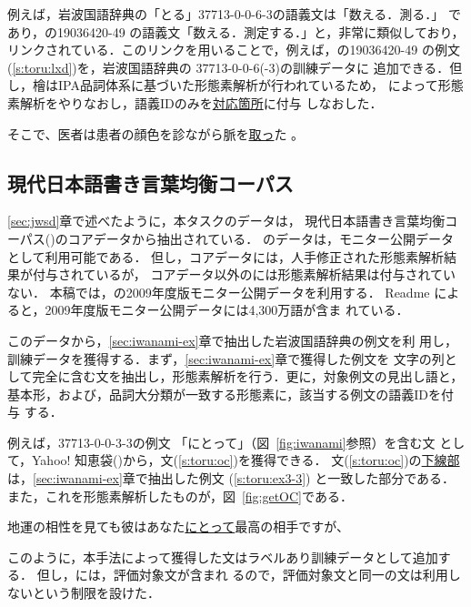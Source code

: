\documentclass[japanese]{jnlp_1.4}
\newcommand{\OC}{}
\newcommand{\unidic}{}
\newcommand{\bccwj}{}
\newcommand{\lxd}{}
\begin{document}
例えば，岩波国語辞典の「とる」37713-0-0-6-3の語義文は「数える．測る．」
であり，\lxd{}の19036420-49 の語義文「数える．測定する．」と，非常に類似しており，
リンクされている．このリンクを用いることで，例えば，\lxd{}の19036420-49
の例文(\ref{s:toru:lxd})を，岩波国語辞典の 37713-0-0-6(-3)の訓練データに
追加できる．但し，檜はIPA品詞体系に基づいた形態素解析が行われているため，
\unidic{}によって形態素解析をやりなおし，語義IDのみを\ul{対応箇所}に付与
しなおした．


\begin{exe}
\ex \label{s:toru:lxd}
そこで、医者は患者の顔色を診ながら脈を\ul{取っ}た 。 
\end{exe}



\subsection{現代日本語書き言葉均衡コーパス} 
\label{sec:bccwj}

\ref{sec:jwsd}章で述べたように，本タスクのデータは，
現代日本語書き言葉均衡コーパス(\bccwj)のコアデータから抽出されている．
\bccwj のデータは，モニター公開データとして利用可能である．
但し，コアデータには，人手修正された形態素解析結果が付与されているが，
コアデータ以外の\bccwj には形態素解析結果は付与されていない．
本稿では，\bccwj の2009年度版モニター公開データを利用する．
Readme によると，\bccwj 2009年度版モニター公開データには4,300万語が含ま
れている．

このデータから，\ref{sec:iwanami-ex}章で抽出した岩波国語辞典の例文を利
用し，訓練データを獲得する．まず，\ref{sec:iwanami-ex}章で獲得した例文を
文字の列として完全に含む文を抽出し，形態素解析を行う．更に，対象例文の見出し語と，
基本形，および，品詞大分類が一致する形態素に，該当する例文の語義IDを付与
する．

例えば，37713-0-0-3-3の例文
「にとって」（図~\ref{fig:iwanami}参照）を含む文
として，Yahoo! 知恵袋(\OC{})から，文(\ref{s:toru:oc})を獲得できる．
文(\ref{s:toru:oc})の\ul{下線部}は，\ref{sec:iwanami-ex}章で抽出した例文
(\ref{s:toru:ex3-3})
と一致した部分である．
また，これを形態素解析したものが，図~\ref{fig:getOC}である．


\begin{exe}
\ex \label{s:toru:oc}
 地運の相性を見ても彼はあなた\ul{にとって}最高の相手ですが、
\end{exe}


このように，本手法によって獲得した文はラベルあり訓練データとして追加する．
但し，\bccwj{}には，評価対象文が含まれ
るので，評価対象文と同一の文は利用しないという制限を設けた．
\end{document}
